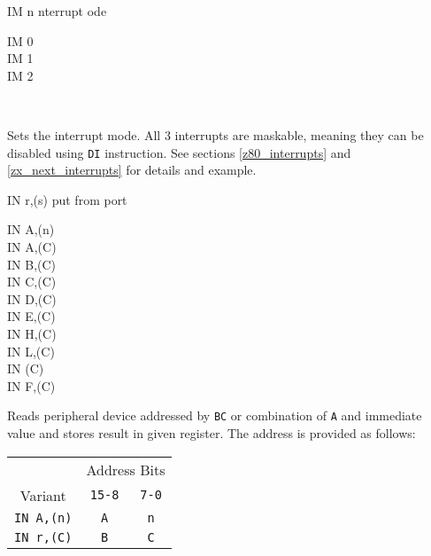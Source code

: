 \begin{basedescript}{
	\desclabelstyle{\multilinelabel}
	\desclabelwidth{3cm}}
	\begin{DetailItem}{IM n}
		{nterrupt ode}
		{}

		\begin{DetailVariants}[2]
			IM 0\\
			IM 1\\
			IM 2
			
			\columnbreak
			~
		\end{DetailVariants}

		Sets the interrupt mode. All 3 interrupts are maskable, meaning they can be disabled using {\tt DI} instruction. See sections \ref{z80_interrupts} and \ref{zx_next_interrupts} for details and example.

		\begin{DetailEffects}
			\FlagsIM		
		\end{DetailEffects}

		\begin{DetailTiming}
		\end{DetailTiming}

	\end{DetailItem}

	\pagebreak
	\begin{DetailItem}{IN r,(s)}
		{put from port}
		{}

		\begin{DetailVariants}
			IN A,(n)\\
			IN A,(C)\\
			IN B,(C)\\
			IN C,(C)\\
			IN D,(C)\\
			IN E,(C)\\
			IN H,(C)\\
			IN L,(C)\\
			IN (C)\UNDOC\\
			IN F,(C)\UNDOC
		\end{DetailVariants}

		Reads peripheral device addressed by {\tt BC} or combination of {\tt A} and immediate value and stores result in given register. The address is provided as follows:

		\begin{tabular}{ccc}
			& \multicolumn{2}{c}{Address Bits} \\
			Variant & {\tt 15-8} & {\tt 7-0} \\
			\hline
			{\tt IN A,(n)} & {\tt A} & {\tt n} \\
			{\tt IN r,(C)} & {\tt B} & {\tt C} \\
		\end{tabular}
		\vspace{1ex} %


\end{DetailItem}
\end{basedescript}
